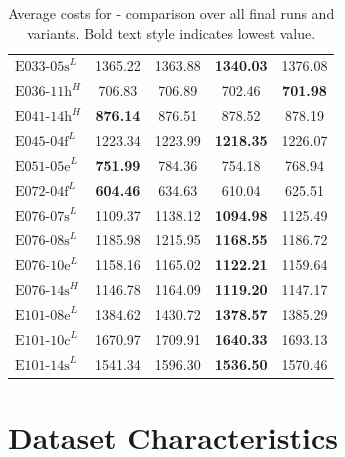 \begin{table}
\begin{tabular}{lcccc}
		$\text{E033-05s}^L$ & 1365.22                     & 1363.88         & \textbf{1340.03} & 1376.08         \\
		$\text{E036-11h}^H$ & 706.83                      & 706.89          & 702.46           & \textbf{701.98} \\
		$\text{E041-14h}^H$ & \textbf{876.14}             & 876.51          & 878.52           & 878.19          \\
		$\text{E045-04f}^L$ & 1223.34                     & 1223.99         & \textbf{1218.35} & 1226.07         \\
		$\text{E051-05e}^L$ & \textbf{751.99}             & 784.36          & 754.18           & 768.94          \\
		$\text{E072-04f}^L$ & \textbf{604.46}             & 634.63          & 610.04           & 625.51          \\
		$\text{E076-07s}^L$ & 1109.37                     & 1138.12         & \textbf{1094.98} & 1125.49         \\
		$\text{E076-08s}^L$ & 1185.98                     & 1215.95         & \textbf{1168.55} & 1186.72         \\
		$\text{E076-10e}^L$ & 1158.16                     & 1165.02         & \textbf{1122.21} & 1159.64         \\
		$\text{E076-14s}^H$ & 1146.78                     & 1164.09         & \textbf{1119.20} & 1147.17         \\
		$\text{E101-08e}^L$ & 1384.62                     & 1430.72         & \textbf{1378.57} & 1385.29         \\
		$\text{E101-10c}^L$ & 1670.97                     & 1709.91         & \textbf{1640.33} & 1693.13         \\
		$\text{E101-14s}^L$ & 1541.34                     & 1596.30         & \textbf{1536.50} & 1570.46         \\
		\bottomrule
	\end{tabular}
	\caption[Average costs for \gendreauDataSetText - comparison over all final runs and variants.]
	{Average costs for \gendreauDataSetText - comparison over all final runs and variants. Bold text style indicates lowest value.}
	\label{tab:final_mean_comparison}
\end{table}
\clearpage

\section{Dataset Characteristics}
\label{sec:visualization}

